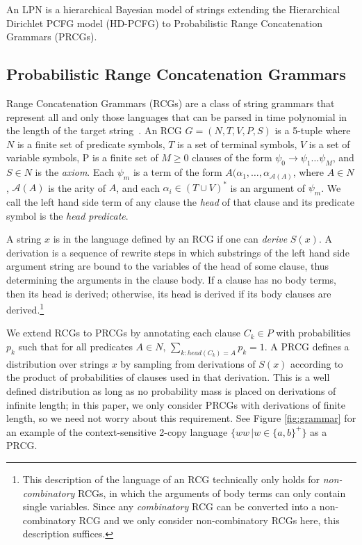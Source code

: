 \documentclass{article} %
\begin{document}
An LPN is a hierarchical Bayesian model of strings
extending the Hierarchical Dirichlet PCFG model (HD-PCFG) to
Probabilistic Range Concatenation Grammars (PRCGs). 

\subsection{Probabilistic Range Concatenation Grammars}
Range Concatenation Grammars (RCGs) are a class of string grammars
that represent all and only those languages that can be parsed in time
polynomial in the length of the target
string~\cite{boullier2005range}. An RCG $G=(N, T, V, P, S)$ is a
5-tuple where $N$ is a finite set of predicate symbols, $T$ is a set
of terminal symbols, $V$ is a set of variable symbols, P is a finite
set of $M \geq 0$ clauses of the form $\psi_0 \rightarrow \psi_1 \dots
\psi_M$, and $S \in N$ is the \emph{axiom}. Each $\psi_m$ is a term of
the form $A(\alpha_1, \dots, \alpha_{\mathcal{A}(A)}$, where $A \in
N$, $\mathcal{A}(A)$ is the arity of $A$, and each $\alpha_i \in (T
\cup V)^*$ is an argument of $\psi_m$. We call the left hand side term
of any clause the \emph{head} of that clause and its predicate symbol
is the \emph{head predicate}.

A string $x$ is in the language defined by an RCG if one can
\emph{derive} $S(x)$. A derivation is a sequence of rewrite steps in
which substrings of the left hand side argument string are bound to
the variables of the head of some clause, thus determining the
arguments in the clause body. If a clause has no body terms, then its
head is derived; otherwise, its head is derived if its body clauses
are derived.\footnote{This description of the language of an RCG
  technically only holds for \emph{non-combinatory} RCGs, in which the
  arguments of body terms can only contain single variables. Since any
  \emph{combinatory} RCG can be converted into a non-combinatory RCG
  and we only consider non-combinatory RCGs here, this description
  suffices.}

We extend RCGs to PRCGs by annotating each clause $C_k \in P$ with
probabilities $p_k$ such that for all predicates ${A \in N, \,
  \sum_{k:head(C_k)=A} p_k = 1}$. A PRCG defines a distribution over
strings $x$ by sampling from derivations of $S(x)$ according to the
product of probabilities of clauses used in that derivation. This is a
well defined distribution as long as no probability mass is placed on
derivations of infinite length; in this paper, we only consider PRCGs
with derivations of finite length, so we need not worry about this
requirement. See Figure \ref{fig:grammar} for an example of the context-sensitive 2-copy language $\{ww\,|w \in \{a,b\}^+\}$ as a PRCG.
\end{document}
